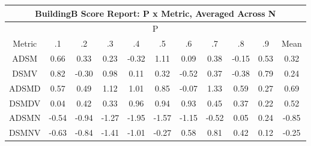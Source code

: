 \begin{longtable}{ | c || c | c | c | c | c | c | c | c | c || c |}
\hline
\multicolumn{11}{|c|}{ BuildingB Score Report: P x Metric, Averaged Across N } \\
\hline
\multicolumn{11}{|c|}{ P } \\
\hline
Metric & .1 & .2 & .3 & .4 & .5 & .6 & .7 & .8 & .9 & Mean\\
\hline
\hline
\endhead
ADSM &  \cellcolor[HTML]{EFEFFF} 0.66 &  \cellcolor[HTML]{F7F7FF} 0.33 &  \cellcolor[HTML]{F7F7FF} 0.23 &  \cellcolor[HTML]{FFF7F7} -0.32 &  \cellcolor[HTML]{E7E7FF} 1.11 &  \cellcolor[HTML]{FFFFFF} 0.09 &  \cellcolor[HTML]{F7F7FF} 0.38 &  \cellcolor[HTML]{FFFFFF} -0.15 &  \cellcolor[HTML]{EFEFFF} 0.53 &  \cellcolor[HTML]{F7F7FF} 0.32 \\
DSMV &  \cellcolor[HTML]{E7E7FF} 0.82 &  \cellcolor[HTML]{FFF7F7} -0.30 &  \cellcolor[HTML]{E7E7FF} 0.98 &  \cellcolor[HTML]{FFFFFF} 0.11 &  \cellcolor[HTML]{F7F7FF} 0.32 &  \cellcolor[HTML]{FFEFEF} -0.52 &  \cellcolor[HTML]{F7F7FF} 0.37 &  \cellcolor[HTML]{FFF7F7} -0.38 &  \cellcolor[HTML]{E7E7FF} 0.79 &  \cellcolor[HTML]{F7F7FF} 0.24 \\
ADSMD &  \cellcolor[HTML]{EFEFFF} 0.57 &  \cellcolor[HTML]{EFEFFF} 0.49 &  \cellcolor[HTML]{DFDFFF} 1.12 &  \cellcolor[HTML]{E7E7FF} 1.01 &  \cellcolor[HTML]{E7E7FF} 0.85 &  \cellcolor[HTML]{FFFFFF} -0.07 &  \cellcolor[HTML]{DFDFFF} 1.33 &  \cellcolor[HTML]{EFEFFF} 0.59 &  \cellcolor[HTML]{F7F7FF} 0.27 &  \cellcolor[HTML]{EFEFFF} 0.69 \\
DSMDV &  \cellcolor[HTML]{FFFFFF} 0.04 &  \cellcolor[HTML]{F7F7FF} 0.42 &  \cellcolor[HTML]{F7F7FF} 0.33 &  \cellcolor[HTML]{E7E7FF} 0.96 &  \cellcolor[HTML]{E7E7FF} 0.94 &  \cellcolor[HTML]{E7E7FF} 0.93 &  \cellcolor[HTML]{F7F7FF} 0.45 &  \cellcolor[HTML]{F7F7FF} 0.37 &  \cellcolor[HTML]{F7F7FF} 0.22 &  \cellcolor[HTML]{EFEFFF} 0.52 \\
ADSMN &  \cellcolor[HTML]{FFEFEF} -0.54 &  \cellcolor[HTML]{FFE7E7} -0.94 &  \cellcolor[HTML]{FFDFDF} -1.27 &  \cellcolor[HTML]{FFCFCF} -1.95 &  \cellcolor[HTML]{FFD7D7} -1.57 &  \cellcolor[HTML]{FFDFDF} -1.15 &  \cellcolor[HTML]{FFEFEF} -0.52 &  \cellcolor[HTML]{FFFFFF} 0.05 &  \cellcolor[HTML]{F7F7FF} 0.24 &  \cellcolor[HTML]{FFE7E7} -0.85 \\
DSMNV &  \cellcolor[HTML]{FFEFEF} -0.63 &  \cellcolor[HTML]{FFE7E7} -0.84 &  \cellcolor[HTML]{FFDFDF} -1.41 &  \cellcolor[HTML]{FFE7E7} -1.01 &  \cellcolor[HTML]{FFF7F7} -0.27 &  \cellcolor[HTML]{EFEFFF} 0.58 &  \cellcolor[HTML]{E7E7FF} 0.81 &  \cellcolor[HTML]{F7F7FF} 0.42 &  \cellcolor[HTML]{FFFFFF} 0.12 &  \cellcolor[HTML]{FFF7F7} -0.25 \\

\end{longtable}
